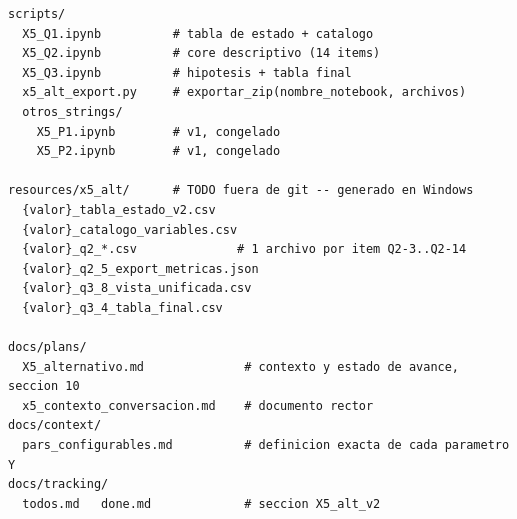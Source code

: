 \documentclass[11pt,a4paper]{article}
\begin{document}
\begin{lstlisting}
scripts/
  X5_Q1.ipynb          # tabla de estado + catalogo
  X5_Q2.ipynb          # core descriptivo (14 items)
  X5_Q3.ipynb          # hipotesis + tabla final
  x5_alt_export.py     # exportar_zip(nombre_notebook, archivos)
  otros_strings/
    X5_P1.ipynb        # v1, congelado
    X5_P2.ipynb        # v1, congelado

resources/x5_alt/      # TODO fuera de git -- generado en Windows
  {valor}_tabla_estado_v2.csv
  {valor}_catalogo_variables.csv
  {valor}_q2_*.csv              # 1 archivo por item Q2-3..Q2-14
  {valor}_q2_5_export_metricas.json
  {valor}_q3_8_vista_unificada.csv
  {valor}_q3_4_tabla_final.csv

docs/plans/
  X5_alternativo.md              # contexto y estado de avance, seccion 10
  x5_contexto_conversacion.md    # documento rector
docs/context/
  pars_configurables.md          # definicion exacta de cada parametro Y
docs/tracking/
  todos.md   done.md             # seccion X5_alt_v2
\end{lstlisting}
\end{document}
